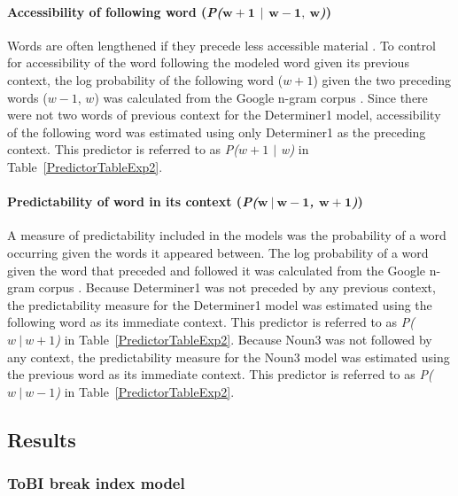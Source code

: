\documentclass[12pt,titlepage]{article}
\newcommand{\IGNORE}[1]{} %
\begin{document}
\paragraph{Accessibility of following word (\textit{P($\mathbf{w + 1}$ $\mathbf|$ $\mathbf{w - 1,~ w}$)})} Words are often lengthened if they precede less accessible material \cite{FoxTreeClark97}. To control for accessibility of the word following the modeled word given its previous context, the log probability of the following word ($w + 1$) given the two preceding words ($w - 1$, $w$) was calculated from the Google n-gram corpus \cite{GoogleNgram}. \IGNORE{This predictor is referred to as \textit{P($w + 1$ $|$ $w - 1,~ w$)} in Table~\ref{PredictorTableExp2}. } Since there were not two words of previous context for the Determiner1 model, accessibility of the following word was estimated using only Determiner1 as the preceding context. This predictor is referred to as \textit{P($w + 1$ $|$ w)} in Table~\ref{PredictorTableExp2}.

\paragraph{Predictability of word in its context (\textit{P($\mathbf{w~|~w - 1}$, $\mathbf{w + 1}$)})} A measure of predictability included in the models was the probability of a word occurring given the words it appeared between. The log probability of a word given the word that preceded and followed it was calculated from the Google n-gram corpus \cite{GoogleNgram}. \IGNORE{ This predictor is referred to as \textit{P($w~|~w - 1$, $w + 1$)} in Table~\ref{PredictorTableExp2}. }Because Determiner1 was not preceded by any previous context, the predictability measure for the Determiner1 model was estimated using the following word as its immediate context. This predictor is referred to as \textit{P($w~|~w +1$)} in Table~\ref{PredictorTableExp2}. Because Noun3 was not followed by any context, the predictability measure for the Noun3 model was estimated using the previous word as its immediate context. This predictor is referred to as \textit{P($w~|~w - 1$)} in Table~\ref{PredictorTableExp2}.


\subsection{Results}


\subsubsection{ToBI break index model}
\end{document}
